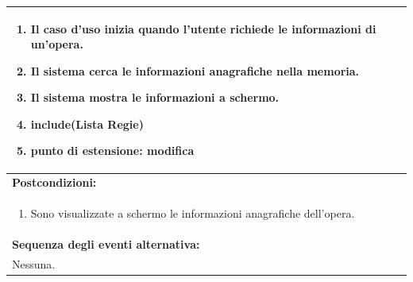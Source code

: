 \documentclass{article}
\begin{document}
\begin{table}[H]
\begin{tabular}{|p{\linewidth}|}
                        \begin{enumerate}
                            \item Il caso d'uso inizia quando l'utente richiede le informazioni di un'opera.
                            \item Il sistema cerca le informazioni anagrafiche nella memoria.
                            \item Il sistema mostra le informazioni a schermo.
                            \item \textbf{include}(Lista Regie)
                            \item[] \textbf{punto di estensione:} modifica
                        \end{enumerate} \\
                        \hline
                        \cellcolor{gray!20}
                        \textbf{Postcondizioni:} \\
                        \cellcolor{gray!20}
                        \begin{minipage}{\linewidth}
                            \begin{enumerate}
                                \item Sono visualizzate a schermo le informazioni anagrafiche dell'opera.
                            \end{enumerate}
                        \end{minipage} \\
                        \hline
                        \textbf{Sequenza degli eventi alternativa:} \\
                        Nessuna. \\
                        \hline
                    \end{tabular}
                \end{table}
\end{document}
